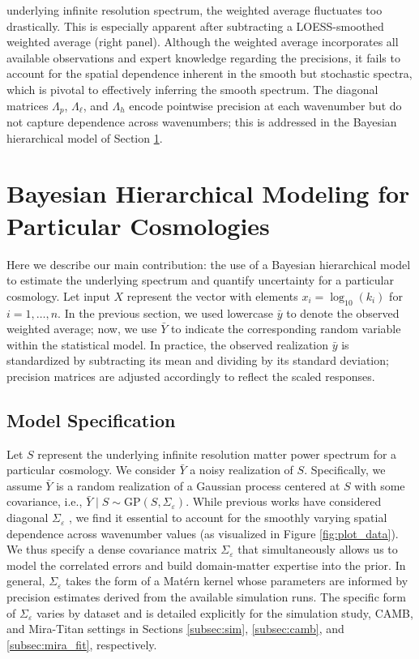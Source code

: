 \documentclass[11pt]{article}
\begin{document}
underlying infinite resolution spectrum, the weighted average fluctuates too drastically.  
This is especially apparent after subtracting a LOESS-smoothed weighted average (right panel).
Although the weighted average incorporates all available observations and 
expert knowledge regarding the precisions, it fails to account for the spatial 
dependence inherent in the smooth but stochastic spectra, which is pivotal to 
effectively inferring the smooth spectrum. The diagonal matrices $\Lambda_p$, 
$\Lambda_\ell$, and $\Lambda_h$ encode pointwise precision at each 
wavenumber but do not capture dependence across wavenumbers; this is 
addressed in the Bayesian hierarchical model of Section \ref{sec:hm_fit}.

\section{Bayesian Hierarchical Modeling for Particular Cosmologies}
\label{sec:hm_fit}

Here we describe our main contribution: the use of a Bayesian hierarchical model 
to estimate the underlying spectrum and quantify uncertainty for a particular cosmology.
Let input $X$ represent the vector with elements $x_i = \log_{10}(k_i)$ for $i=1,\dots,n$.
In the previous section, we used lowercase $\bar{y}$ to denote 
the observed weighted average; now, we use $\bar{Y}$ to indicate the corresponding 
random variable within the statistical model.  
In practice, the observed realization $\bar{y}$ is standardized by subtracting its 
mean and dividing by its standard deviation; precision matrices are adjusted 
accordingly to reflect the scaled responses.

\subsection{Model Specification}
\label{sec:mod_spec}

Let $S$ represent the underlying infinite resolution matter power spectrum for a 
particular cosmology.  We consider $\bar{Y}$ a noisy realization of $S$.
Specifically, we assume $\bar{Y}$ is a random realization of a Gaussian 
process centered at $S$ with some covariance, i.e., 
$\bar{Y}\mid S \sim \mathrm{GP}(S, \Sigma_\varepsilon)$.  While previous works
have considered diagonal $\Sigma_\varepsilon$ \citep{moran2023mira}, we find it
essential to account for the smoothly varying spatial dependence across wavenumber values 
(as visualized in Figure \ref{fig:plot_data}).  We thus specify a dense 
covariance matrix $\Sigma_\varepsilon$ that simultaneously
allows us to model the correlated errors and build domain-matter expertise
into the prior. In general, $\Sigma_\varepsilon$
takes the form of a Mat\'ern kernel \citep{stein1999interpolation} whose parameters 
are informed by precision estimates derived from the available simulation runs. 
The specific form of $\Sigma_\varepsilon$ varies by dataset and is detailed 
explicitly for the simulation study, CAMB, and Mira-Titan settings in Sections 
\ref{subsec:sim}, \ref{subsec:camb}, and \ref{subsec:mira_fit}, respectively.
\end{document}
